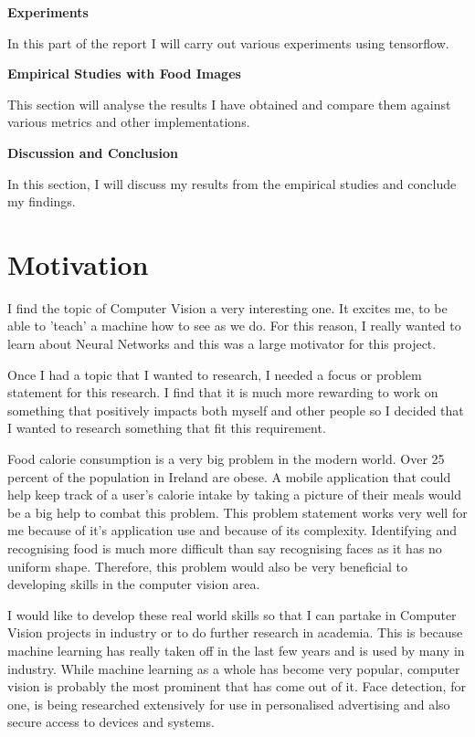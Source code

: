 \textbf{Experiments}

In this part of the report I will carry out various experiments using
tensorflow.

\textbf{Empirical Studies with Food Images}

This section will analyse the results I have obtained and compare them against various metrics and other implementations.

\textbf{Discussion and Conclusion}

In this section, I will discuss my results from the empirical studies and conclude my findings.


\section{Motivation}
I find the topic of Computer Vision a very interesting one.
It excites me, to be able to 'teach' a machine how to see as we do.
For this reason, I really wanted to learn about Neural Networks
and this was a large motivator for this project.

Once I had a topic that I wanted to research, I needed a focus or problem statement for this research.
I find that it is much more rewarding to work on something that positively
impacts both myself and other people so I decided that I wanted to research
something that fit this requirement.

Food calorie consumption is a very big problem in the modern world.
Over 25 percent of the population in Ireland are obese.
A mobile application that could help keep track of a user's calorie intake by taking a picture of their meals would be a big help to combat this problem.
This problem statement works very well for me because of it's application use and because of its complexity.
Identifying and recognising food is much more difficult than say recognising faces as it has no uniform shape.
Therefore, this problem would also be very beneficial to developing skills in the computer vision area.

I would like to develop these real world skills so that I can partake in
Computer Vision projects in industry or to do further research in academia. This
is because machine learning has really taken off in the last few years and is
used by many in industry. While machine learning as a whole has become very
popular, computer vision is probably the most prominent that has come out of it.
Face detection, for one, is being researched extensively for use in personalised
advertising and also secure access to devices and systems.
